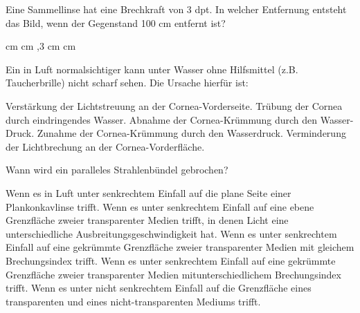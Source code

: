 \documentclass[11pt]{exam}
\begin{document}
\setlength{\voffset}{-0.5in}
\setlength{\headsep}{5pt}

\hspace{2mm}
 \hspace{5mm}
\vspace{4mm}

\begin{questions}

\question Eine Sammellinse hat eine Brechkraft von 3 dpt. In welcher Entfernung entsteht das Bild, wenn der Gegenstand 100 cm entfernt ist?

\begin{choices}
	 cm
	 cm
	,3 cm
	\choice 150cm
	 cm
\end{choices}

\vspace{3mm}\question Ein in Luft normalsichtiger kann unter Wasser ohne Hilfsmittel (z.B. Taucherbrille) nicht scharf sehen. Die Ursache hierfür ist:

\begin{choices}
	\choice Verstärkung der Lichtstreuung an der Cornea-Vorderseite.
	\choice Trübung der Cornea durch eindringendes Wasser.
	\choice Abnahme der Cornea-Krümmung durch den Wasser-Druck.
	\choice Zunahme der Cornea-Krümmung durch den Wasserdruck.
	\choice Verminderung der Lichtbrechung an der Cornea-Vorderfläche.
\end{choices}

\vspace{3mm}\question Wann wird ein paralleles Strahlenbündel gebrochen?

\begin{choices}
	\choice Wenn es in Luft unter senkrechtem Einfall auf die plane Seite einer Plankonkavlinse trifft.
	\choice Wenn es unter senkrechtem Einfall auf eine ebene Grenzfläche zweier transparenter Medien trifft, in denen Licht eine unterschiedliche Ausbreitungsgeschwindigkeit hat.
	\choice Wenn es unter senkrechtem Einfall auf eine gekrümmte Grenzfläche zweier transparenter Medien mit gleichem Brechungsindex trifft.
	\choice Wenn es unter senkrechtem Einfall auf eine gekrümmte Grenzfläche zweier transparenter Medien mitunterschiedlichem Brechungsindex trifft.
	\choice Wenn es unter nicht senkrechtem Einfall auf die Grenzfläche eines transparenten und eines nicht-transparenten Mediums trifft.
\end{choices}


\end{questions}
\end{document}
